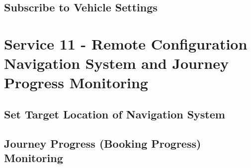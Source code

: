 \subsection*{Subscribe to Vehicle Settings}
\label{subsec:Nachrichten:Dienst10:BookingSettingsSubscription}














\section{Service 11 - Remote Configuration Navigation System and Journey Progress Monitoring}
\label{sec:Nachrichten:Dienst11}

\subsection*{Set Target Location of Navigation System}
\label{subsec:Nachrichten:Dienst11:SetNavigationDestination}





\subsection*{Journey Progress (Booking Progress) Monitoring}
\label{subsec:Nachrichten:Dienst11:BookingProgressSubscription}












